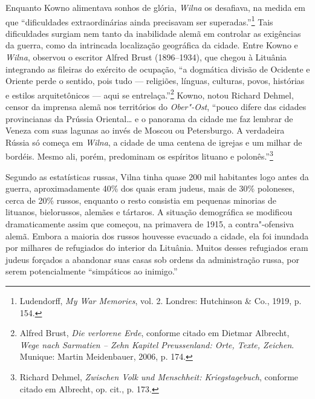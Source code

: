 Enquanto Kowno alimentava sonhos de glória, \textit{Wilna} os desafiava, na
medida em que ``dificuldades extraordinárias ainda precisavam ser
superadas.''\footnote{Ludendorff, \textit{My War Memories}, vol. 2. Londres: Hutchinson \& Co., 1919, p. 154.} Tais dificuldades surgiam nem tanto da inabilidade alemã em controlar as exigências da guerra,
como da intrincada localização geográfica da cidade. Entre Kowno e
\textit{Wilna}, observou o escritor Alfred Brust (1896--1934), que chegou à
Lituânia integrando as fileiras do exército de ocupação, ``a dogmática
divisão de Ocidente e Oriente perde o sentido, pois tudo --- religiões,
línguas, culturas, povos, histórias e estilos arquitetônicos --- aqui se
entrelaça.''\footnote{Alfred Brust, \textit{Die verlorene Erde}, conforme citado em Dietmar Albrecht, \textit{Wege nach Sarmatien -- Zehn Kapitel Preussenland: Orte, Texte, Zeichen}. Munique: Martin Meidenbauer, 2006, p. 174.} Kowno, notou Richard Dehmel, censor da imprensa alemã nos territórios do \textit{Ober"-Ost}, ``pouco difere das cidades
provincianas da Prússia Oriental\ldots{} e o panorama da cidade me faz
lembrar de Veneza com suas lagunas ao invés de Moscou ou Petersburgo. A
verdadeira Rússia só começa em \textit{Wilna}, a cidade de uma centena de igrejas
e um milhar de bordéis. Mesmo ali, porém, predominam os espíritos
lituano e polonês.''\footnote{Richard Dehmel, \textit{Zwischen Volk und Menschheit: Kriegstagebuch}, conforme citado em Albrecht, op. cit., p. 173.}

Segundo as estatísticas russas, Vilna tinha quase 200 mil habitantes
logo antes da guerra, aproximadamente 40\% dos quais eram judeus, mais
de 30\% poloneses, cerca de 20\% russos, enquanto o resto consistia em
pequenas minorias de lituanos, bielorussos, alemães e tártaros. A
situação demográfica se modificou dramaticamente assim que começou, na
primavera de 1915, a contra"-ofensiva alemã. Embora a maioria dos russos
houvesse evacuado a cidade, ela foi inundada por milhares de refugiados
do interior da Lituânia. Muitos desses refugiados eram judeus forçados a
abandonar suas casas sob ordens da administração russa, por serem
potencialmente ``simpáticos ao inimigo.''

